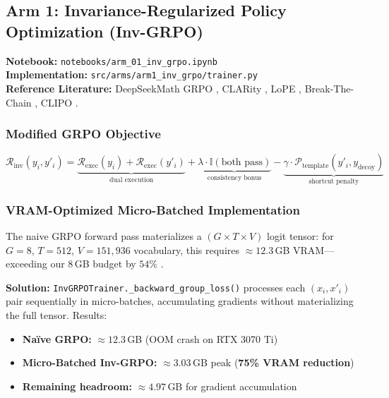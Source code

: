 \documentclass[12pt, a4paper]{article}
\begin{document}
\subsection{Arm 1: Invariance-Regularized Policy Optimization (Inv-GRPO)}
\textbf{Notebook:} \texttt{notebooks/arm\_01\_inv\_grpo.ipynb}\\
\textbf{Implementation:} \texttt{src/arms/arm1\_inv\_grpo/trainer.py}\\
\textbf{Reference Literature:} DeepSeekMath GRPO \cite{grpo_deepseek}, CLARity \cite{clarity_rl}, LoPE \cite{lope_perturbation}, Break-The-Chain \cite{break_the_chain}, CLIPO \cite{clipo_rl}.

\subsubsection{Modified GRPO Objective}

\begin{equation}
\mathcal{R}_{\text{inv}}(y_i, y'_i) = \underbrace{\mathcal{R}_{\text{exec}}(y_i) + \mathcal{R}_{\text{exec}}(y'_i)}_{\text{dual execution}} + \underbrace{\lambda \cdot \mathbb{I}(\text{both pass})}_{\text{consistency bonus}} - \underbrace{\gamma \cdot \mathcal{P}_{\text{template}}(y'_i, y_{\text{decoy}})}_{\text{shortcut penalty}}
\end{equation}

\subsubsection{VRAM-Optimized Micro-Batched Implementation}

\begin{week8box}[title={\faMemory\ OOM Resolution: Micro-Batched Inv-GRPO}]
The naive GRPO forward pass materializes a $(G \times T \times V)$ logit tensor: for $G=8$, $T=512$, $V=151{,}936$ vocabulary, this requires $\approx 12.3$\,GB VRAM---exceeding our 8\,GB budget by $54\%$ \cite{grpo_deepseek}.

\textbf{Solution:} \texttt{InvGRPOTrainer.\_backward\_group\_loss()} processes each $(x_i, x'_i)$ pair sequentially in micro-batches, accumulating gradients without materializing the full tensor. Results:
\begin{itemize}[leftmargin=*]
  \item \textbf{Na\"ive GRPO:} $\approx 12.3$\,GB (OOM crash on RTX 3070 Ti)
  \item \textbf{Micro-Batched Inv-GRPO:} $\approx \mathbf{3.03}$\,GB peak (\textbf{75\% VRAM reduction})
  \item \textbf{Remaining headroom:} $\approx 4.97$\,GB for gradient accumulation
\end{itemize}
\end{week8box}
\end{document}
